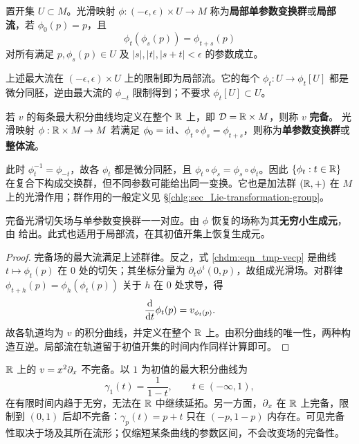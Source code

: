 \begin{definition}\label{chdm:def_1PTG-local}
    置开集 $U\subset M$。光滑映射 $\phi:(-\epsilon,\epsilon)\times U\to M$ 称为\textbf{局部单参数变换群}或\textbf{局部流}，若 $\phi_0(p)=p$，且
    \[
        \phi_t(\phi_s(p))=\phi_{t+s}(p)
    \]
    对所有满足 $p,\phi_s(p)\in U$ 及 $|s|,|t|,|s+t|<\epsilon$ 的参数成立。
\end{definition}

上述最大流在 $(-\epsilon,\epsilon)\times U$ 上的限制即为局部流。它的每个 $\phi_t:U\to\phi_t[U]$ 都是微分同胚，逆由最大流的 $\phi_{-t}$ 限制得到；不要求 $\phi_t[U]\subset U$。

\begin{definition}\label{chdm:def_vector-complete}
    若 $v$ 的每条最大积分曲线均定义在整个 $\mathbb{R}$ 上，即 $\mathcal D=\mathbb{R}\times M$，则称 $v$ \textbf{完备}。
    光滑映射 $\phi:\mathbb{R}\times M\to M$ 若满足 $\phi_0=\mathrm{id}$、$\phi_t\circ\phi_s=\phi_{t+s}$，则称为\textbf{单参数变换群}或\textbf{整体流}。
\end{definition}

此时 $\phi_t^{-1}=\phi_{-t}$，故各 $\phi_t$ 都是微分同胚，且 $\phi_t\circ\phi_s=\phi_s\circ\phi_t$。因此 $\{\phi_t:t\in\mathbb{R}\}$ 在复合下构成交换群，但不同参数可能给出同一变换。它也是加法群 $(\mathbb{R},+)$ 在 $M$ 上的光滑作用；群作用的一般定义见 \S\ref{chlg:sec_Lie-transformation-group}。

\begin{theorem}
    完备光滑切矢场与单参数变换群一一对应。由 $\phi$ 恢复的场称为其\textbf{无穷小生成元}，由
    给出。此式也适用于局部流，在其初值开集上恢复生成元。
\end{theorem}
\begin{proof}
    完备场的最大流满足上述群律。反之，式 \eqref{chdm:eqn_tmp-vecp} 是曲线 $t\mapsto\phi_t(p)$ 在 $0$ 处的切矢；其坐标分量为 $\partial_t\phi^i(0,p)$，故组成光滑场。对群律 $\phi_{t+h}(p)=\phi_h(\phi_t(p))$ 关于 $h$ 在 $0$ 处求导，得
    \[
        \frac{\dd}{\dd t}\phi_t(p)=v_{\phi_t(p)}.
    \]
    故各轨道均为 $v$ 的积分曲线，并定义在整个 $\mathbb{R}$ 上。由积分曲线的唯一性，两种构造互逆。局部流在轨道留于初值开集的时间内作同样计算即可。
\end{proof}

\begin{example}
    $\mathbb{R}$ 上的 $v=x^2\partial_x$ 不完备。以 $1$ 为初值的最大积分曲线为
    \[
        \gamma_1(t)=\frac1{1-t},\qquad t\in(-\infty,1),
    \]
    在有限时间内趋于无穷，无法在 $\mathbb{R}$ 中继续延拓。另一方面，$\partial_x$ 在 $\mathbb{R}$ 上完备，限制到 $(0,1)$ 后却不完备：$\gamma_p(t)=p+t$ 只在 $(-p,1-p)$ 内存在。可见完备性取决于场及其所在流形；仅缩短某条曲线的参数区间，不会改变场的完备性。
\end{example}

